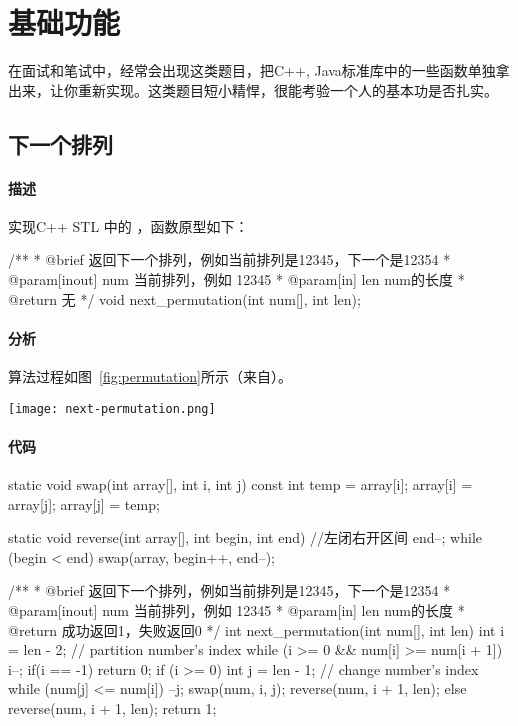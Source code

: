 \chapter{基础功能}
在面试和笔试中，经常会出现这类题目，把C++, Java标准库中的一些函数单独拿出来，让你重新实现。这类题目短小精悍，很能考验一个人的基本功是否扎实。

\section{下一个排列} %
\label{sec:nextpermutation}

\subsubsection{描述}
实现C++ STL 中的 ，函数原型如下：

\begin{Code}
/**
 * @brief 返回下一个排列，例如当前排列是12345，下一个是12354
 * @param[inout] num 当前排列，例如 12345
 * @param[in] len num的长度
 * @return 无
 */
void next_permutation(int num[], int len);
\end{Code}

\subsubsection{分析}
算法过程如图~\ref{fig:permutation}所示（来自）。

\begin{center}
\texttt{[image: next-permutation.png]}\\
\label{fig:permutation}
\end{center}

\subsubsection{代码}

\begin{Codex}[label=next_permutation.c]
static void swap(int array[], int i, int j) {
    const int temp = array[i];
    array[i] = array[j];
    array[j] = temp;
}

static void reverse(int array[], int begin, int end) { //左闭右开区间
    end--;
    while (begin < end)
        swap(array, begin++, end--);
}

/**
 * @brief 返回下一个排列，例如当前排列是12345，下一个是12354
 * @param[inout] num 当前排列，例如 12345
 * @param[in] len num的长度
 * @return 成功返回1，失败返回0
 */
int next_permutation(int num[], int len) {
    int i = len - 2;  // partition number's index
    while (i >= 0 && num[i] >= num[i + 1])
        i--;
    if(i == -1) return 0;
    if (i >= 0) {
        int j = len - 1;  // change number's index
        while (num[j] <= num[i])
            --j;
        swap(num, i, j);
        reverse(num, i + 1, len);
    } else {
        reverse(num, i + 1, len);
    }
    return 1;
}
\end{Codex}

